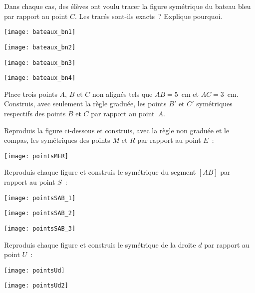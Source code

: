 \begin{exercice}
Dans chaque cas, des élèves ont voulu tracer la figure symétrique du bateau bleu par rapport au point $C$. Les tracés sont-ils exacts ? Explique pourquoi. 
\begin{colenumerate}{2}
 \item 
 
 \texttt{[image: bateaux\_bn1]}
 \item 
 
 \texttt{[image: bateaux\_bn2]}
 \item 
 
 \texttt{[image: bateaux\_bn3]}
 \item 
 
 \texttt{[image: bateaux\_bn4]}
 \end{colenumerate}
\end{exercice}


\begin{exercice}
Place trois points $A$, $B$ et $C$ non alignés tels que $AB = 5$ cm et $AC = 3$ cm. Construis, avec seulement la règle graduée, les points $B'$ et $C'$ symétriques respectifs des points $B$ et $C$ par rapport au point $A$.
\end{exercice}


\begin{exercice}
Reproduis la figure ci-dessous et construis, avec la règle non graduée et le compas, les symétriques des points $M$ et $R$ par rapport au point $E$ :
 \begin{center} \texttt{[image: pointsMER]} \end{center}
\end{exercice}


\begin{exercice}
Reproduis chaque figure et construis le symétrique du segment $[AB]$ par rapport au point $S$ :
\begin{colenumerate}{3}
 \item 
 
 \texttt{[image: pointsSAB\_1]}
  \item 
 
 \texttt{[image: pointsSAB\_2]}
  \item 
 
 \texttt{[image: pointsSAB\_3]}
 \end{colenumerate}
\end{exercice}


\begin{exercice}
Reproduis chaque figure et construis le symétrique de la droite $d$ par rapport au point $U$ :
\begin{colenumerate}{2}
 \item 
 
 \texttt{[image: pointsUd]}
  \item 
 
 \texttt{[image: pointsUd2]}
 \end{colenumerate}
\end{exercice}


